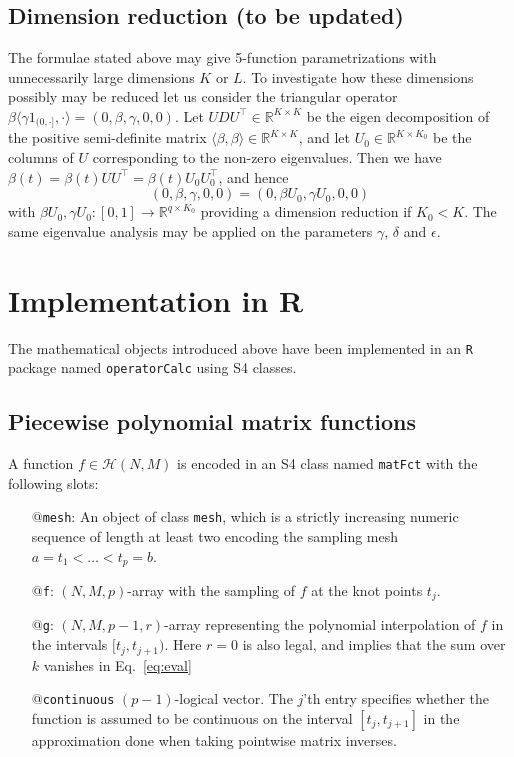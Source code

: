 \documentclass[12pt,a4paper]{article}
\newcommand{\Rset}{\mathbb{R}}
\begin{document}
\subsection{Dimension reduction (to be updated)}

The formulae stated above may give 5-function parametrizations with unnecessarily large dimensions $K$ or $L$. To investigate how these dimensions possibly may be reduced let us consider the triangular operator $\beta \langle\gamma 1_{(0,\cdot]},\cdot\rangle = (0,\beta,\gamma,0,0)$. Let $U D U^\top \in \Rset^{K \times K}$ be the eigen decomposition of the positive semi-definite matrix $\langle\beta,\beta\rangle \in \Rset^{K \times K}$, and let $U_0 \in \Rset^{K \times K_0}$ be the columns of $U$ corresponding to the non-zero eigenvalues. Then we have $\beta(t) = \beta(t) U U^\top = \beta(t) U_0 U_0^\top$, and hence
\begin{equation*}
(0,\beta,\gamma,0,0) = (0,\beta U_0,\gamma U_0,0,0)
\end{equation*}
with $\beta U_0, \gamma U_0\colon [0,1] \to \Rset^{q \times K_0}$ providing a dimension reduction if $K_0 < K$. The same eigenvalue analysis may be applied on the parameters $\gamma$, $\delta$ and $\epsilon$.


\section{Implementation in R}

The mathematical objects introduced above have been implemented in an \texttt{R} package named \texttt{operatorCalc} using S4 classes.

\subsection{Piecewise polynomial matrix functions}

A function $f \in \mathcal{H}(N,M)$ is encoded in an S4 class named \texttt{matFct} with the following slots: 
\begin{itemize}
\item[@\texttt{mesh}:] An object of class \texttt{mesh}, which is a strictly increasing numeric sequence of length at least two encoding the sampling mesh $a=t_1 < \dotsc < t_p = b$.
\item[@\texttt{f}:] $(N,M,p)$-array with the sampling of $f$ at the knot points $t_j$.
\item[@\texttt{g}:] $(N,M,p-1,r)$-array representing the polynomial interpolation of $f$ in the intervals $[t_j,t_{j+1})$. Here $r=0$ is also legal, and implies that the sum over $k$ vanishes in Eq.~\eqref{eq:eval}
\item[@\texttt{continuous}] $(p-1)$-logical vector. The $j$'th entry specifies whether the function is assumed to be continuous on the interval $[t_j,t_{j+1}]$ in the approximation done when taking pointwise matrix inverses. 
\end{itemize}
\end{document}
